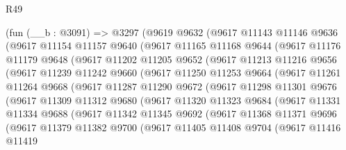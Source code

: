 \begin{lexlean}{R49}
\begin{coremodule}
    (fun (__b : @3091) =>
    @3297
      (@9619
        @9632
        (@9617
          @11143
          @11146
          @9636
          (@9617
            @11154
            @11157
            @9640
            (@9617
              @11165
              @11168
              @9644
              (@9617
                @11176
                @11179
                @9648
                (@9617
                  @11202
                  @11205
                  @9652
                  (@9617
                    @11213
                    @11216
                    @9656
                    (@9617
                      @11239
                      @11242
                      @9660
                      (@9617
                        @11250
                        @11253
                        @9664
                        (@9617
                          @11261
                          @11264
                          @9668
                          (@9617
                            @11287
                            @11290
                            @9672
                            (@9617
                              @11298
                              @11301
                              @9676
                              (@9617
                                @11309
                                @11312
                                @9680
                                (@9617
                                  @11320
                                  @11323
                                  @9684
                                  (@9617
                                    @11331
                                    @11334
                                    @9688
                                    (@9617
                                      @11342
                                      @11345
                                      @9692
                                      (@9617
                                        @11368
                                        @11371
                                        @9696
                                        (@9617
                                          @11379
                                          @11382
                                          @9700
                                          (@9617
                                            @11405
                                            @11408
                                            @9704
                                            (@9617
                                              @11416
                                              @11419

\end{coremodule}
\end{lexlean}
